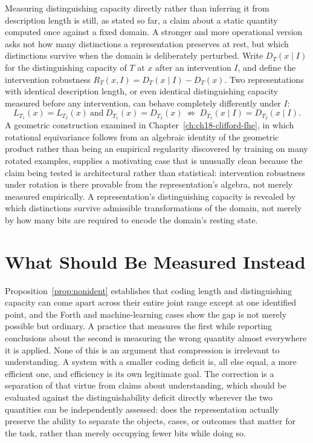 Measuring distinguishing capacity directly rather than inferring it from description length is still, as stated so far, a claim about a static quantity computed once against a fixed domain. A stronger and more operational version asks not how many distinctions a representation preserves at rest, but which distinctions survive when the domain is deliberately perturbed. Write $D_T(x \mid I)$ for the distinguishing capacity of $T$ at $x$ after an intervention $I$, and define the intervention robustness $R_T(x,I) = D_T(x\mid I) - D_T(x)$. Two representations with identical description length, or even identical distinguishing capacity measured before any intervention, can behave completely differently under $I$:
\[
L_{T_1}(x) = L_{T_2}(x) \ \text{and}\ D_{T_1}(x) = D_{T_2}(x) \ \not\Rightarrow\ D_{T_1}(x\mid I) = D_{T_2}(x\mid I).
\]
A geometric construction examined in Chapter~\ref{ch:ch18-clifford-fhe}, in which rotational equivariance follows from an algebraic identity of the geometric product rather than being an empirical regularity discovered by training on many rotated examples, supplies a motivating case that is unusually clean because the claim being tested is architectural rather than statistical: intervention robustness under rotation is there provable from the representation's algebra, not merely measured empirically. A representation's distinguishing capacity is revealed by which distinctions survive admissible transformations of the domain, not merely by how many bits are required to encode the domain's resting state.

\section{What Should Be Measured Instead}

Proposition~\ref{prop:nonident} establishes that coding length and distinguishing capacity can come apart across their entire joint range except at one identified point, and the Forth and machine-learning cases show the gap is not merely possible but ordinary. A practice that measures the first while reporting conclusions about the second is measuring the wrong quantity almost everywhere it is applied. None of this is an argument that compression is irrelevant to understanding. A system with a smaller coding deficit is, all else equal, a more efficient one, and efficiency is its own legitimate goal. The correction is a separation of that virtue from claims about understanding, which should be evaluated against the distinguishability deficit directly wherever the two quantities can be independently assessed: does the representation actually preserve the ability to separate the objects, cases, or outcomes that matter for the task, rather than merely occupying fewer bits while doing so.

